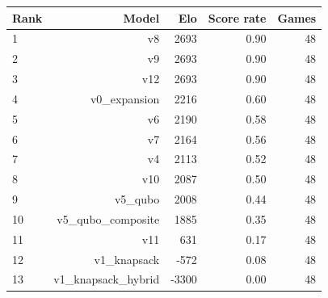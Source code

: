 \begin{tabular}{lrrrr}
\toprule
Rank & Model & Elo & Score rate & Games \\
\midrule
1 & v8 & 2693 & 0.90 & 48 \\
2 & v9 & 2693 & 0.90 & 48 \\
3 & v12 & 2693 & 0.90 & 48 \\
4 & v0\_expansion & 2216 & 0.60 & 48 \\
5 & v6 & 2190 & 0.58 & 48 \\
6 & v7 & 2164 & 0.56 & 48 \\
7 & v4 & 2113 & 0.52 & 48 \\
8 & v10 & 2087 & 0.50 & 48 \\
9 & v5\_qubo & 2008 & 0.44 & 48 \\
10 & v5\_qubo\_composite & 1885 & 0.35 & 48 \\
11 & v11 & 631 & 0.17 & 48 \\
12 & v1\_knapsack & -572 & 0.08 & 48 \\
13 & v1\_knapsack\_hybrid & -3300 & 0.00 & 48 \\
\bottomrule
\end{tabular}
